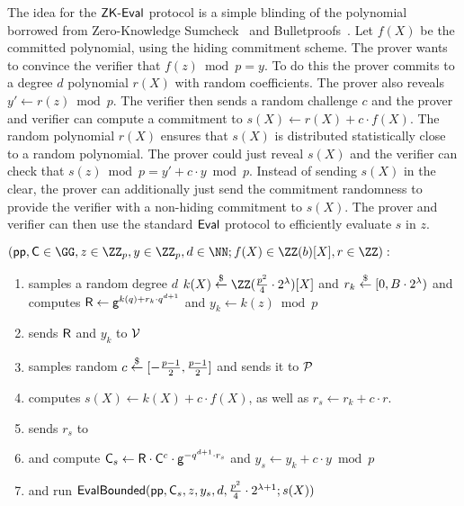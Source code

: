 The idea for the $\textsf{{ZK-Eval}}$ protocol is a simple blinding of the polynomial borrowed from Zero-Knowledge Sumcheck~\cite{EPRINT:ChiForSpo17} and Bulletproofs~\cite{EC:BCCGP16,SP:BBBPWM18}. Let $f(X)$ be the committed polynomial, using the hiding commitment scheme. The prover wants to convince the verifier that $f(z)\bmod p=y$. To do this the prover commits to a degree $d$ polynomial $r(X)$ with random coefficients. The prover also reveals $y'\gets r(z)\bmod p$. The verifier then sends a random challenge $c$ and the prover and verifier can compute a commitment to $s(X)\gets r(X)+c\cdot f(X)$. The random polynomial $r(X)$ ensures that $s(X)$ is distributed statistically close to a random polynomial. The prover could just reveal $s(X)$ and the verifier can check that $s(z)\bmod p=y'+c \cdot y\bmod p$. Instead of sending $s(X)$ in the clear, the prover can additionally just send the commitment randomness to provide the verifier with a non-hiding commitment to $s(X)$. The prover and verifier can then use the standard $\textsf{{Eval}}$ protocol to efficiently evaluate $s$ in $z$.
 \noindent\begin{mdframed}[userdefinedwidth=\textwidth]
\begin{minipage}{\textwidth}
	\begin{flushleft}
	$(\params, \gr{C} \in \GG, z \in \ZZ_p, y \in \ZZ_p, d \in \NN; f(X) \in \ZZ(b)[X], r \in \ZZ):$\\
	\begin{enumerate}[nolistsep]
		    \item \prover samples a random degree $d$ $k(X) \sample \ZZ(\frac{p^2}{4}\cdot 2^\lambda)[X]$ and $r_k \overset{\$}{\gets} [0,B\cdot 2^\lambda)$ and computes $\mathsf{R} \gets \mathsf{g}^{k(q) + r_k \cdot q^{d+1}}$ and $y_k \gets k(z) \bmod p$
		    \item \prover sends $\mathsf{R}$ and $y_k$ to $\mathcal{V}$
		    \item \verifier samples random $c\overset{\$}{\gets} [-\frac{p-1}{2},\frac{p-1}{2}]$ and sends it to $\mathcal{P}$
		    \item \prover computes $s(X)\gets k(X) + c \cdot f(X)$, as well as $r_s \gets r_k + c\cdot r$.
		    \item \prover sends $r_s$ to \verifier
		    \item \prover and \verifier compute $\mathsf{C}_s\gets \mathsf{R} \cdot \mathsf{C}^c \cdot \mathsf{g}^{-q^{d+1}\cdot r_s}$ and $y_s\gets y_k+c \cdot y \bmod p$ 
		    \item \prover and \verifier run $\textsf{{EvalBounded}}(\textsf{pp},\mathsf{C}_s,z,y_s,d,\frac{p^2}{4}\cdot 2^{\lambda+1};s(X))$ 
		   		\end{enumerate}
	\end{flushleft}
\end{minipage}
\end{mdframed}



